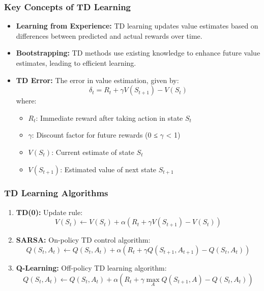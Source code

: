 \documentclass[aspectratio=169]{beamer}
\begin{document}
\begin{frame}[fragile]
    \frametitle{Key Concepts of TD Learning}
    \begin{itemize}
        \item \textbf{Learning from Experience:} 
            TD learning updates value estimates based on differences between predicted and actual rewards over time.
        \item \textbf{Bootstrapping:} 
            TD methods use existing knowledge to enhance future value estimates, leading to efficient learning.
        \item \textbf{TD Error:} 
            The error in value estimation, given by:
            \begin{equation}
                \delta_t = R_t + \gamma V(S_{t+1}) - V(S_t)
            \end{equation}
            where:
            \begin{itemize}
                \item $R_t$: Immediate reward after taking action in state $S_t$
                \item $\gamma$: Discount factor for future rewards (0 ≤ $\gamma$ < 1)
                \item $V(S_t)$: Current estimate of state $S_t$
                \item $V(S_{t+1})$: Estimated value of next state $S_{t+1}$
            \end{itemize}
    \end{itemize}
\end{frame}

\begin{frame}[fragile]
    \frametitle{TD Learning Algorithms}
    \begin{enumerate}
        \item \textbf{TD(0):} 
            Update rule:
            \begin{equation}
                V(S_t) \gets V(S_t) + \alpha \left(R_t + \gamma V(S_{t+1}) - V(S_t)\right)
            \end{equation}
        \item \textbf{SARSA:} 
            On-policy TD control algorithm:
            \begin{equation}
                Q(S_t, A_t) \gets Q(S_t, A_t) + \alpha \left(R_t + \gamma Q(S_{t+1}, A_{t+1}) - Q(S_t, A_t)\right)
            \end{equation}
        \item \textbf{Q-Learning:} 
            Off-policy TD learning algorithm:
            \begin{equation}
                Q(S_t, A_t) \gets Q(S_t, A_t) + \alpha \left(R_t + \gamma \max_{A} Q(S_{t+1}, A) - Q(S_t, A_t)\right)
            \end{equation}
    \end{enumerate}
\end{frame}
\end{document}
